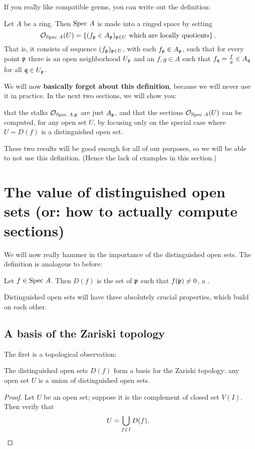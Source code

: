 If you really like compatible germs,
you can write out the definition:
\begin{definition}
	Let $A$ be a ring.
	Then $\text{Spec } A$ is made into a ringed space by setting
	\[ \mathcal O_{\text{Spec } A}(U)
		= \left\{ (f_\mathfrak p \in A_\mathfrak p)_{\mathfrak p \in U}
		\text{ which are locally quotients} \right\}. \]
	That is, it consists of sequence $(f_\mathfrak p)_{\mathfrak p \in U}$, with
	each $f_\mathfrak p \in A_\mathfrak p$, such that for every point $\mathfrak p$ there
	is an open neighborhood $U_\mathfrak p$ and an $f,g \in A$ such that
	$f_\mathfrak q = \frac fg \in A_\mathfrak q$ for all $\mathfrak q \in U_\mathfrak p$.
\end{definition}

We will now \textbf{basically forget about this definition},
because we will never use it in practice.
In the next two sections, we will show you:
\begin{itemize}
	\ii that the stalks $\mathcal O_{\text{Spec } A, \mathfrak p}$ are just $A_\mathfrak p$, and
	\ii that the sections $\mathcal O_{\text{Spec } A}(U)$
	can be computed, for any open set $U$,
	by focusing only on the special case where $U = D(f)$
	is a distinguished open set.
\end{itemize}
These two results will be good enough for all of our purposes,
so we will be able to not use this definition.
(Hence the lack of examples in this section.)

\section{The value of distinguished open sets (or: how to actually compute sections)}

We will now really hammer in the importance of
the distinguished open sets.
The definition is analogous to before:
\begin{definition}
	Let $f \in \text{Spec } A$.
	Then $D(f)$ is the set of $\mathfrak p$ such that $f(\mathfrak p) \neq 0$,
	a .
\end{definition}
Distinguished open sets will have three absolutely crucial properties,
which build on each other.

\subsection{A basis of the Zariski topology}
The first is a topological observation:
\begin{theorem}
	\label{thm:distinguished_base}
	The distinguished open sets $D(f)$
	form a basis for the Zariski topology:
	any open set $U$ is a union of distinguished open sets.
\end{theorem}
\begin{proof}
	Let $U$ be an open set;
	suppose it is the complement of closed set $V(I)$.
	Then verify that \[ U = \bigcup_{f \in I} D(f). \qedhere \]
\end{proof}

